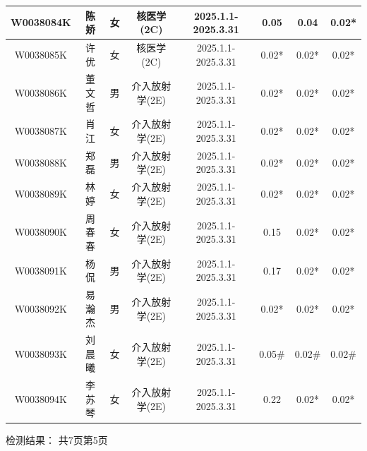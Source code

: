 \begin{table}[H]
\begin{tabular}{|c|c|c|c|c|c|c|c|}
\hline
W0038084K & 陈娇 & 女 & 核医学(2C) & 2025.1.1-2025.3.31 & 0.05 & 0.04 & 0.02* \\
\hline
W0038085K & 许优 & 女 & 核医学(2C) & 2025.1.1-2025.3.31 & 0.02* & 0.02* & 0.02* \\
\hline
W0038086K & 董文哲 & 男 & 介入放射学(2E) & 2025.1.1-2025.3.31 & 0.02* & 0.02* & 0.02* \\
\hline
W0038087K & 肖江 & 女 & 介入放射学(2E) & 2025.1.1-2025.3.31 & 0.02* & 0.02* & 0.02* \\
\hline
W0038088K & 郑磊 & 男 & 介入放射学(2E) & 2025.1.1-2025.3.31 & 0.02* & 0.02* & 0.02* \\
\hline
W0038089K & 林婷 & 女 & 介入放射学(2E) & 2025.1.1-2025.3.31 & 0.02* & 0.02* & 0.02* \\
\hline
W0038090K & 周春春 & 女 & 介入放射学(2E) & 2025.1.1-2025.3.31 & 0.15 & 0.02* & 0.02* \\
\hline
W0038091K & 杨侃 & 男 & 介入放射学(2E) & 2025.1.1-2025.3.31 & 0.17 & 0.02* & 0.02* \\
\hline
W0038092K & 易瀚杰 & 男 & 介入放射学(2E) & 2025.1.1-2025.3.31 & 0.02* & 0.02* & 0.02* \\
\hline
W0038093K & 刘晨曦 & 女 & 介入放射学(2E) & 2025.1.1-2025.3.31 & 0.05\# & 0.02\# & 0.02\# \\
\hline
W0038094K & 李苏琴 & 女 & 介入放射学(2E) & 2025.1.1-2025.3.31 & 0.22 & 0.02* & 0.02* \\
\hline
\end{tabular}
\end{table}


检测结果：
共7页第5页

